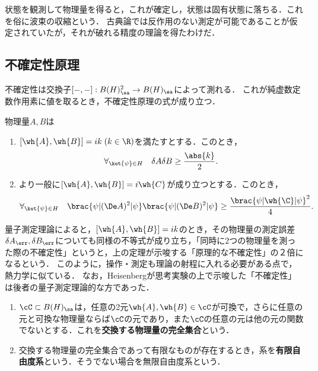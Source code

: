 \documentclass[uplatex,dvipdfmx]{jsreport}
\begin{document}
\begin{remarks}[状態の観測]
    状態を観測して物理量を得ると，これが確定し，状態は固有状態に落ちる．これを俗に波束の収縮という．
    古典論では反作用のない測定が可能であることが仮定されていたが，それが破れる精度の理論を得たわけだ．
\end{remarks}

\subsection{不確定性原理}

\begin{tcolorbox}[colframe=ForestGreen, colback=ForestGreen!10!white,breakable,colbacktitle=ForestGreen!40!white,coltitle=black,fonttitle=\bfseries\sffamily,
title=]
    不確定性は交換子$[-,-]:B(H)_\sa^2\to B(H)_\sa$によって測れる．
    これが純虚数定数作用素に値を取るとき，不確定性原理の式が成り立つ．
\end{tcolorbox}

\begin{theorem}
    物理量$A,B$は
    \begin{enumerate}
        \item $[\wh{A},\wh{B}]=ik\;(k\in\R)$を満たすとする．このとき，
        \[\forall_{\ket{\psi}\in H}\quad\delta A\delta B\ge\frac{\abs{k}}{2}.\]
        \item より一般に$[\wh{A},\wh{B}]=i\wh{C}$が成り立つとする．このとき，
        \[\forall_{\ket{\psi}\in H}\quad\brac{\psi|(\De A)^2|\psi}\brac{\psi|(\De B)^2|\psi}\ge\frac{\brac{\psi|\wh{\C}|\psi}^2}{4}.\]
    \end{enumerate}
\end{theorem}
\begin{remark}
    量子測定理論によると，$[\wh{A},\wh{B}]=ik$のとき，その物理量の測定誤差$\delta A_\err,\delta B_\err$についても同様の不等式が成り立ち，「同時に2つの物理量を測った際の不確定性」というと，上の定理が示唆する「原理的な不確定性」の２倍になるという．
    このように，操作・測定も理論の射程に入れる必要がある点で，熱力学に似ている．
    なお，Heisenbergが思考実験の上で示唆した「不確定性」は後者の量子測定理論的な方であった．
\end{remark}

\begin{definition}\mbox{}
    \begin{enumerate}
        \item $\cC\subset B(H)_\sa$は，任意の2元$\wh{A},\wh{B}\in\cC$が可換で，さらに任意の元と可換な物理量ならば$\cC$の元であり，また$\cC$の任意の元は他の元の関数でないとする．これを\textbf{交換する物理量の完全集合}という．
        \item 交換する物理量の完全集合であって有限なものが存在するとき，系を\textbf{有限自由度系}という．そうでない場合を無限自由度系という．
    \end{enumerate}
\end{definition}
\end{document}
